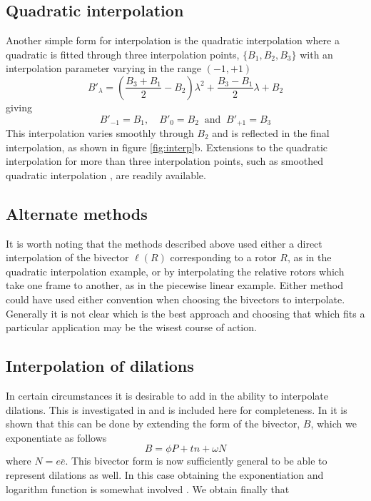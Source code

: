 \subsection{Quadratic interpolation}

Another simple form for interpolation is the quadratic interpolation where a quadratic 
is fitted through three interpolation points, $\{B_1, B_2, B_3\}$ with an interpolation
parameter varying in the range $(-1,+1)$
\[
B'_\lambda = \left(\frac{B_3 + B_1}{2} - B_2\right)\lambda^2 + \frac{B_3 - B_1}{2}\lambda + B_2
\]
giving
\[
B'_{-1} = B_1,\quad B'_{0}=B_2\ \mbox{ and }\ B'_{+1} = B_3
\]
This interpolation varies smoothly through $B_2$ and is reflected in the final
interpolation, as shown in figure \ref{fig:interp}b. Extensions to the quadratic
interpolation for more than three interpolation points, such as smoothed
quadratic interpolation \cite{cendes}, are readily available.

\subsection{Alternate methods}

It is worth noting that the methods described above
used either a direct interpolation of the bivector $\ell(R)$ corresponding
to a rotor $R$, as in the quadratic interpolation example, or by interpolating 
the relative rotors which take one frame
to another, as in the piecewise linear example. Either method could have used either
convention when choosing the bivectors to interpolate. Generally it is not clear
which is the best approach and choosing that which fits a particular application
may be the wisest course of action.

\subsection{Interpolation of dilations}

In certain circumstances it is desirable to add in the ability to interpolate
dilations. This is investigated in \cite{jic23fyr} and is included here
for completeness. In \cite{jic23fyr} it is shown that this can be done by extending
the form of the bivector, $B$, which we exponentiate as follows
\[
B = \phi P + tn + \omega N
\]
where $N = e\bar{e}$. This bivector form is now sufficiently general
\cite{jic23fyr} to be able to represent dilations as well. In this case obtaining the
exponentiation
and logarithm function is somewhat involved \cite{jic23fyr}. We obtain
finally that

